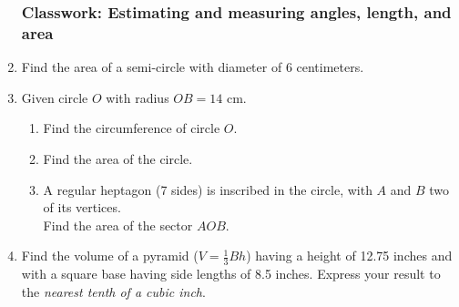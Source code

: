 \documentclass[12pt, twoside]{article}
\begin{document}
\begin{enumerate}
\newpage
\subsubsection*{Classwork: Estimating and measuring angles, length, and area} 
\item Find the area of a semi-circle with diameter of 6 centimeters.
   \begin{flushright}
  \end{flushright}

\item Given circle $O$ with radius $OB=14$ cm.
    \begin{multicols}{2}
    \raggedcolumns
    \begin{enumerate}
      \item Find the circumference of circle $O$. \vspace{1.7cm}
      \item Find the area of the circle.  \vspace{2cm}
      \item A regular heptagon (7 sides) is inscribed in the circle, with $A$ and $B$ two of its vertices. \\[0.25cm]
      Find the area of the sector $AOB$. \vspace{1.5cm}
    \end{enumerate}
    \end{multicols}  \vspace{3cm}

\item Find the volume of a pyramid ($V=\frac{1}{3}Bh$) having a height of 12.75 inches and with a square base having side lengths of 8.5 inches. Express your result to the \emph{nearest tenth of a cubic inch}. \vspace{5cm}


\end{enumerate}
\end{document}
